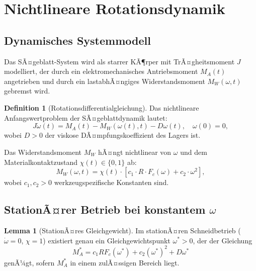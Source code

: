 ﻿\documentclass[a4paper,12pt]{article}
\theoremstyle{definition}
\newtheorem{definition}{Definition}
\newtheorem{lemma}{Lemma}
\begin{document}
\section{Nichtlineare Rotationsdynamik}
\label{sec:rotation}

\subsection{Dynamisches Systemmodell}

Das SÃ¤geblatt-System wird als starrer KÃ¶rper mit TrÃ¤gheitsmoment $J$ modelliert,
der durch ein elektromechanisches Antriebsmoment $M_A(t)$ angetrieben und durch
ein lastabhÃ¤ngiges Widerstandsmoment $M_W(\omega, t)$ gebremst wird.

\begin{definition}[Rotationsdifferentialgleichung]
Das nichtlineare Anfangswertproblem der SÃ¤geblattdynamik lautet:
\begin{equation}
\label{eq:rotation_dgl}
J \dot{\omega}(t) = M_A(t) - M_W(\omega(t), t) - D \omega(t), \quad \omega(0) = 0,
\end{equation}
wobei $D > 0$ der viskose DÃ¤mpfungskoeffizient des Lagers ist.
\end{definition}

Das Widerstandsmoment $M_W$ hÃ¤ngt nichtlinear von $\omega$ und dem
Materialkontaktzustand $\chi(t) \in \{0, 1\}$ ab:
\begin{equation}
\label{eq:widerstand}
M_W(\omega, t) = \chi(t) \cdot \left[ c_1 \cdot R \cdot F_c(\omega) + c_2 \cdot \omega^2 \right],
\end{equation}
wobei $c_1, c_2 > 0$ werkzeugspezifische Konstanten sind.

\subsection{StationÃ¤rer Betrieb bei konstantem $\omega$}

\begin{lemma}[StationÃ¤res Gleichgewicht]
\label{lem:gleichgewicht}
Im stationÃ¤ren Schneidbetrieb ($\dot{\omega} = 0$, $\chi = 1$) existiert genau ein
Gleichgewichtspunkt $\omega^* > 0$, der der Gleichung
\[
M_A^* = c_1 R F_c(\omega^*) + c_2 (\omega^*)^2 + D\omega^*
\]
genÃ¼gt, sofern $M_A^*$ in einem zulÃ¤ssigen Bereich liegt.
\end{lemma}
\end{document}
